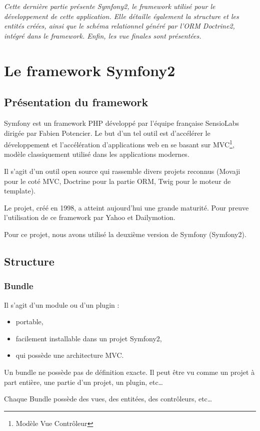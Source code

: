 \textit{Cette dernière partie présente Symfony2, le framework utilisé pour le développement de cette application. Elle détaille également la structure et les entités créées, ainsi que le schéma relationnel généré par l'ORM Doctrine2, intégré dans le framework. Enfin, les vue finales sont présentées.}

\section{Le framework Symfony2}
\subsection{Présentation du framework}
Symfony est un framework PHP développé par l'équipe française SensioLabs dirigée par Fabien Potencier. Le but d'un tel outil est d’accélérer le développement et l'accélération d'applications web en se basant sur MVC\footnote{Modèle Vue Contrôleur}, modèle classiquement utilisé dans les applications modernes.

Il s'agit d'un outil open source qui rassemble divers projets reconnus (Movaji pour le coté MVC, Doctrine pour la partie ORM, Twig pour le moteur de template).

Le projet, créé en 1998, a atteint aujourd'hui une grande maturité. Pour preuve l'utilisation de ce framework par Yahoo et Dailymotion.

Pour ce projet, nous avons utilisé la deuxième version de Symfony (Symfony2).

\subsection{Structure}

\subsubsection{Bundle}
Il s'agit d'un module ou d'un plugin :
\begin{itemize}
\item portable,
\item facilement installable dans un projet Symfony2,
\item qui possède une architecture MVC.
\end{itemize}

Un bundle ne possède pas de définition exacte. Il peut être vu comme un projet à part entière, une partie d'un projet, un plugin, etc\ldots

Chaque Bundle possède des vues, des entitées, des contrôleurs, etc\ldots

